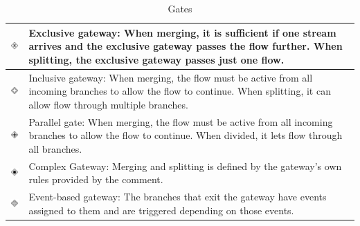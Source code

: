 \documentclass[thesis=M,english]{FITthesis}[2019/12/23]
\begin{document}
\begin{table}[ht!]
\caption{Gates} \label{tableGate}
\begin{center}
\begin{tabular}{ | p{1cm} | m{9cm} | } \hline
    \includegraphics[width=1cm]{assets/BPNMicons/ExkluzivnaBrana.pdf} & Exclusive gateway: When merging, it is sufficient if one stream arrives and the exclusive gateway passes the flow further.
When splitting, the exclusive gateway passes just one flow.  \\   \hline
    \includegraphics[width=1cm]{assets/BPNMicons/InkluzivnaBrana.pdf} &  
Inclusive gateway: When merging, the flow must be active from all incoming branches to allow the flow to continue.
When splitting, it can allow flow through multiple branches.   \\  \hline
    \includegraphics[width=1cm]{assets/BPNMicons/ParalernaBrana.pdf} & Parallel gate: When merging, the flow must be active from all incoming branches to allow the flow to continue.
When divided, it lets flow through all branches.  \\ \hline
    \includegraphics[width=1cm]{assets/BPNMicons/KomplexnaBrana.pdf} & Complex Gateway: Merging and splitting is defined by the gateway's own rules provided by the comment. \\ \hline
    \includegraphics[width=1cm]{assets/BPNMicons/BranaNaZakladeUdalosti.pdf} & Event-based gateway: The branches that exit the gateway have events assigned to them and are triggered depending on those events.  \\ \hline
\end{tabular}
\end{center}
\end{table}
\end{document}
